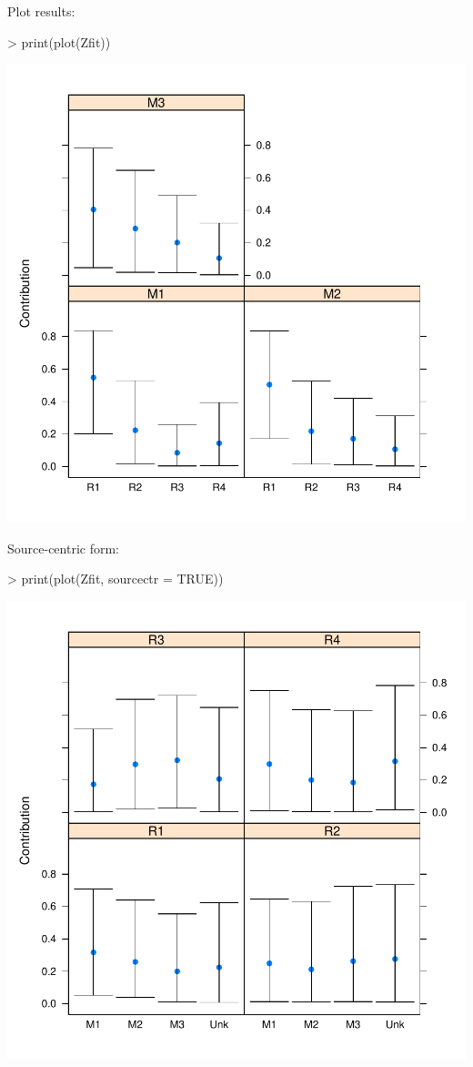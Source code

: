 \documentclass[11pt]{article}
\begin{document}
Plot results:
\begin{Schunk}
\begin{Sinput}
> print(plot(Zfit))
\end{Sinput}
\end{Schunk}
\includegraphics{mixstock-041}

Source-centric form:
\begin{Schunk}
\begin{Sinput}
> print(plot(Zfit, sourcectr = TRUE))
\end{Sinput}
\end{Schunk}
\includegraphics{mixstock-042}
\end{document}
